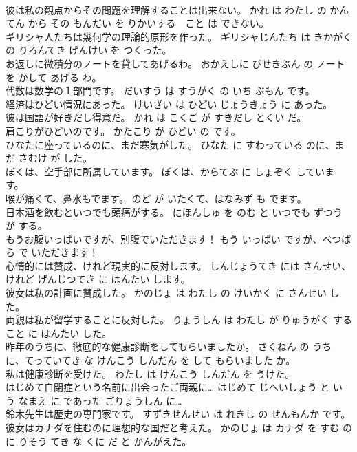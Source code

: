 \documentclass[8pt]{extreport}
\begin{document}
\begin{CJK}{UTF8}{min}
\\	彼は私の観点からその問題を理解することは出来ない。	かれ は わたし の かんてん から その もんだい を りかいする　こと は できない。	
\\	ギリシャ人たちは幾何学の理論的原形を作った。	ギリシャじんたち は きかがく の りろんてき げんけい を つくった。	
\\	お返しに微積分のノートを貸してあげるわ。	おかえしに びせきぶん の ノート を かして あげる わ。	
\\	代数は数学の１部門です。	だいすう は すうがく の いち ぶもん です。	
\\	経済はひどい情況にあった。	けいざい は ひどい じょうきょう に あった。	
\\	彼は国語が好きだし得意だ。	かれ は こくご が すきだし とくい だ。	
\\	肩こりがひどいのです。	かたこり が ひどい の です。	
\\	ひなたに座っているのに、まだ寒気がした。	ひなた に すわっている のに、まだ さむけ が した。	
\\	ぼくは、空手部に所属しています。	ぼくは、からてぶ に しょぞく しています。	
\\	喉が痛くて、鼻水もでます。	のど が いたくて、はなみず も でます。	
\\	日本酒を飲むといつでも頭痛がする。	にほんしゅ を のむ と いつでも ずつう が する。	
\\	もうお腹いっぱいですが、別腹でいただきます！	もう いっぱい ですが、べつばら で いただきます！	
\\	心情的には賛成、けれど現実的に反対します。	しんじょうてき には さんせい、けれど げんじつてき に はんたい します。	
\\	彼女は私の計画に賛成した。	かのじょ は わたし の けいかく に さんせい した。	
\\	両親は私が留学することに反対した。	りょうしん は わたし が りゅうがく する こと に はんたい した。	
\\	昨年のうちに、徹底的な健康診断をしてもらいましたか。	さくねん の うち に、てっていてき な けんこう しんだん を して もらいました か。	
\\	私は健康診断を受けた。	わたし は けんこう しんだん を うけた。	
\\	はじめて自閉症という名前に出会ったご両親に…	はじめて じへいしょう と いう なまえ に であった ごりょうしん に…	
\\	鈴木先生は歴史の専門家です。	すずきせんせい は れきし の せんもんか です。	
\\	彼女はカナダを住むのに理想的な国だと考えた。	かのじょ は カナダ を すむ のに りそう てき な くに だ と かんがえた。	

\end{CJK}
\end{document}
